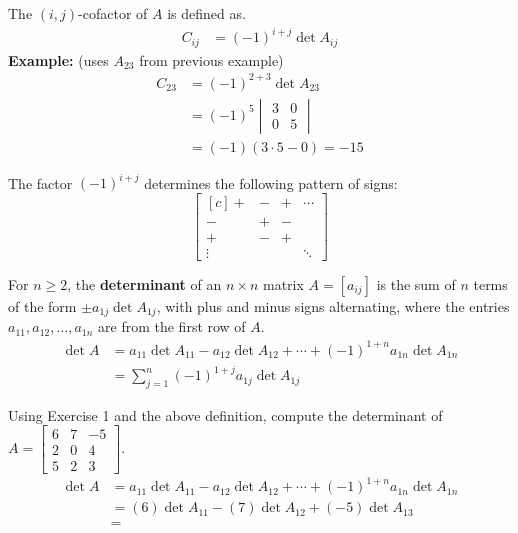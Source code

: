 \begin{boxme}
	\vspace{-1em}
	\begin{multicols}{2}
		The $(i,j)$-cofactor of $A$ is defined as.
		\begin{align*}
		C_{ij} &= (-1)^{i+j}\det A_{ij}
		\end{align*}
		\textbf{Example:} (uses $A_{23}$ from previous example)
		\begin{align*}
		C_{23} &= (-1)^{2+3}\det A_{23} \\
		&= (-1)^5\begin{vmatrix} 3&0 \\ 0&5 \end{vmatrix} \\
		&= (-1)(3\cdot 5 - 0) = -15
		\end{align*}
		
		\columnbreak
		
		The factor $(-1)^{i+j}$ determines the following pattern of signs:
		$$\begin{bmatrix}[c] +&-&+&\cdots \\ -&+&-& \\ +&-&+& \\ \vdots&&&\ddots \end{bmatrix}$$
	\end{multicols}
\end{boxme}
\begin{boxdef}
	For $n\geq 2$, the \textbf{determinant} of an $n\times n$ matrix $A=[a_{ij}]$ is the sum of $n$ terms of the form $\pm a_{1j}\det A_{1j}$, with plus and minus signs alternating, where the entries $a_{11},a_{12},\ldots,a_{1n}$ are from the first row of $A$. 
	\begin{align*}
	\det A &= a_{11}\det A_{11} - a_{12}\det A_{12} + \cdots + (-1)^{1+n}a_{1n}\det A_{1n} \\
	&= \sum_{j=1}^n(-1)^{1+j}a_{1j}\det A_{1j}
	\end{align*}
\end{boxdef}
\begin{exercise} %
	Using Exercise 1 and the above definition, compute the determinant of $A=\begin{bmatrix}6&7&-5\\2&0&4\\5&2&3\end{bmatrix}$.
	\vspace{-1ex}
	\begin{align*}
	\det A &= a_{11}\det A_{11} - a_{12}\det A_{12} + \cdots + (-1)^{1+n}a_{1n}\det A_{1n} \\
	&= (6)\det A_{11} - (7)\det A_{12} + (-5)\det A_{13} \\[1em]
	&=
	\end{align*}
\end{exercise}
\vfill


